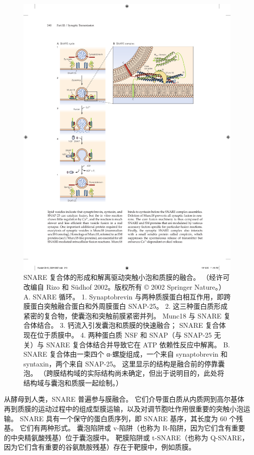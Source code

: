 \begin{figure}[htbp]
	\centering
	\includegraphics[width=0.8\linewidth]{chap15/fig_15_12}
	\caption{SNARE 复合体的形成和解离驱动突触小泡和质膜的融合。 （经许可改编自 Rizo 和 Südhof 2002。版权所有 © 2002 Springer Nature。） A. SNARE 循环。 1. Synaptobrevin 与两种质膜蛋白相互作用，即跨膜蛋白突触融合蛋白和外周膜蛋白 SNAP-25。 2. 这三种蛋白质形成紧密的复合物，使囊泡和突触前膜紧密并列。 Munc18 与 SNARE 复合体结合。 3. 钙流入引发囊泡和质膜的快速融合； SNARE 复合体现在位于质膜中。 4. 两种蛋白质 NSF 和 SNAP（与 SNAP-25 无关）与 SNARE 复合体结合并导致它在 ATP 依赖性反应中解离。 B. SNARE 复合体由一束四个 α-螺旋组成，一个来自 synaptobrevin 和 syntaxin，两个来自 SNAP-25。 这里显示的结构是融合前的停靠囊泡。 （跨膜结构域的实际结构尚未确定，但出于说明目的，此处将结构域与囊泡和质膜一起绘制。）}
	\label{fig:15_12}
\end{figure}


从酵母到人类，SNARE 普遍参与膜融合。 
它们介导蛋白质从内质网到高尔基体再到质膜的运动过程中的组成型膜运输，以及对调节胞吐作用很重要的突触小泡运输。 
SNARE 具有一个保守的蛋白质序列，即 SNARE 基序，其长度为 60 个残基。 
它们有两种形式。 囊泡陷阱或 v-陷阱（也称为 R-陷阱，因为它们含有重要的中央精氨酸残基）位于囊泡膜中。 
靶膜陷阱或 t-SNARE（也称为 Q-SNARE，因为它们含有重要的谷氨酰胺残基）存在于靶膜中，例如质膜。


